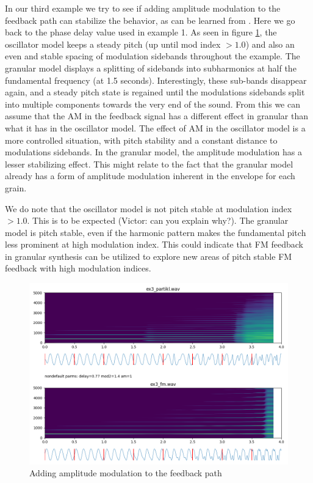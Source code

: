 \documentclass[runningheads,a4paper]{llncs}
\begin{document}
In our third example we  try to see if adding amplitude modulation to the feedback path can stabilize the behavior, as can be learned from \cite{Lazzarini-2024}. Here we go back to the phase delay value used in example 1. As seen in figure \ref{fig:ex3}, the oscillator model keeps a steady pitch (up until mod index $> 1.0$) and also an even and stable spacing of modulation sidebands throughout the example. The granular model displays a splitting of sidebands into subharmonics at half the fundamental frequency (at 1.5 seconds). Interestingly, these sub-bands disappear again, and a steady pitch state is regained until the modulations sidebands split into multiple components towards the very end of the sound.
From this we can assume that the AM in the feedback signal has a different effect in granular than what it has in the oscillator model. The effect of AM in the oscillator model is a more controlled situation, with pitch stability and a constant distance to modulations sidebands. In the granular model, the amplitude modulation has a lesser stabilizing effect. This might relate to the fact that the granular model already has a form of amplitude modulation inherent in the envelope for each grain.

We do note that the oscillator model is not pitch stable at modulation index $> 1.0$. This is to be expected (Victor: can you explain why?). The granular model is pitch stable, even if the harmonic pattern makes the fundamental pitch less prominent at high modulation index. This could indicate that FM feedback in granular synthesis can be utilized to explore new areas of pitch stable FM feedback with high modulation indices.

\begin{figure}
	\centering
	\includegraphics[width=.95\textwidth]{ex3_compare.png}
	\caption{Adding amplitude modulation to the feedback path}
	\label{fig:ex3}
\end{figure}
\end{document}

